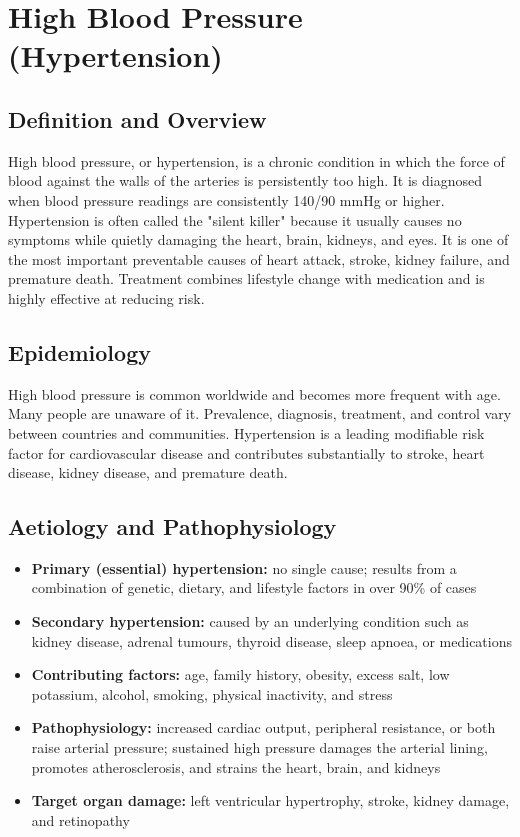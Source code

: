 \chapter{High Blood Pressure (Hypertension)}

\section*{Definition and Overview}
High blood pressure, or hypertension, is a chronic condition in which the force of blood against the walls of the arteries is persistently too high. It is diagnosed when blood pressure readings are consistently 140/90 mmHg or higher. Hypertension is often called the "silent killer" because it usually causes no symptoms while quietly damaging the heart, brain, kidneys, and eyes. It is one of the most important preventable causes of heart attack, stroke, kidney failure, and premature death. Treatment combines lifestyle change with medication and is highly effective at reducing risk.

\section*{Epidemiology}
High blood pressure is common worldwide and becomes more frequent with age. Many people are unaware of it. Prevalence, diagnosis, treatment, and control vary between countries and communities. Hypertension is a leading modifiable risk factor for cardiovascular disease and contributes substantially to stroke, heart disease, kidney disease, and premature death.

\section*{Aetiology and Pathophysiology}
\begin{itemize}
    \item \textbf{Primary (essential) hypertension:} no single cause; results from a combination of genetic, dietary, and lifestyle factors in over 90\% of cases
    \item \textbf{Secondary hypertension:} caused by an underlying condition such as kidney disease, adrenal tumours, thyroid disease, sleep apnoea, or medications
    \item \textbf{Contributing factors:} age, family history, obesity, excess salt, low potassium, alcohol, smoking, physical inactivity, and stress
    \item \textbf{Pathophysiology:} increased cardiac output, peripheral resistance, or both raise arterial pressure; sustained high pressure damages the arterial lining, promotes atherosclerosis, and strains the heart, brain, and kidneys
    \item \textbf{Target organ damage:} left ventricular hypertrophy, stroke, kidney damage, and retinopathy
\end{itemize}

